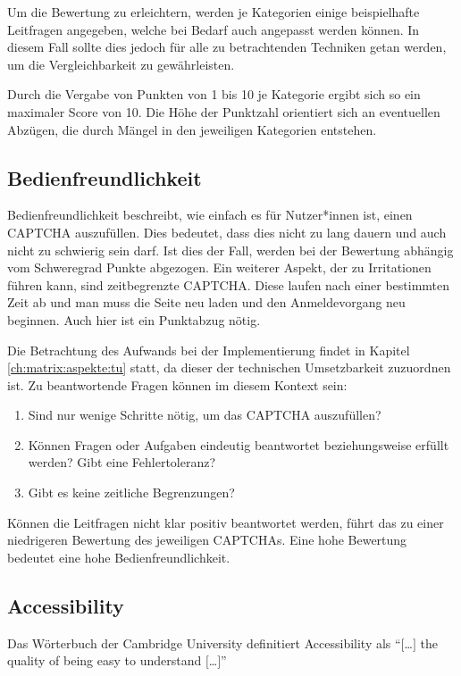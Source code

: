 Um die Bewertung zu erleichtern, werden je Kategorien einige beispielhafte Leitfragen angegeben, welche bei Bedarf auch angepasst werden können.
In diesem Fall sollte dies jedoch für alle zu betrachtenden Techniken getan werden, um die Vergleichbarkeit zu gewährleisten.

Durch die Vergabe von Punkten von 1 bis 10 je Kategorie ergibt sich so ein maximaler Score von 10.
Die Höhe der Punktzahl orientiert sich an eventuellen Abzügen, die durch Mängel in den jeweiligen Kategorien entstehen.

\subsection{Bedienfreundlichkeit}
\label{ch:matrix:aspekte:Bedienfreundlichkeit}
Bedienfreundlichkeit beschreibt, wie einfach es für Nutzer*innen ist, einen CAPTCHA auszufüllen.
Dies bedeutet, dass dies nicht zu lang dauern und auch nicht zu schwierig sein darf. 
Ist dies der Fall, werden bei der Bewertung abhängig vom Schweregrad Punkte abgezogen. %
Ein weiterer Aspekt, der zu Irritationen führen kann, sind zeitbegrenzte CAPTCHA. 
Diese laufen nach einer bestimmten Zeit ab und man muss die Seite neu laden und den Anmeldevorgang neu beginnen.
Auch hier ist ein Punktabzug nötig.

Die Betrachtung des Aufwands bei der Implementierung findet in Kapitel \ref{ch:matrix:aspekte:tu} statt, da dieser der technischen Umsetzbarkeit zuzuordnen ist.
Zu beantwortende Fragen können im diesem Kontext sein:
\begin{enumerate}
    \item Sind nur wenige Schritte nötig, um das CAPTCHA auszufüllen?
    \item Können Fragen oder Aufgaben eindeutig beantwortet beziehungsweise erfüllt werden? Gibt eine Fehlertoleranz?
    \item Gibt es keine zeitliche Begrenzungen?
\end{enumerate}
Können die Leitfragen nicht klar positiv beantwortet werden, führt das zu einer niedrigeren Bewertung des jeweiligen CAPTCHAs.
Eine hohe Bewertung bedeutet eine hohe Bedienfreundlichkeit. 

\subsection{Accessibility}
\label{ch:matrix:aspekte:accessibility}
Das Wörterbuch der Cambridge University definitiert Accessibility als ``$[$\dots$]$ the quality of being easy to understand $[$\dots$]$'' \cite{CACD:2008}

